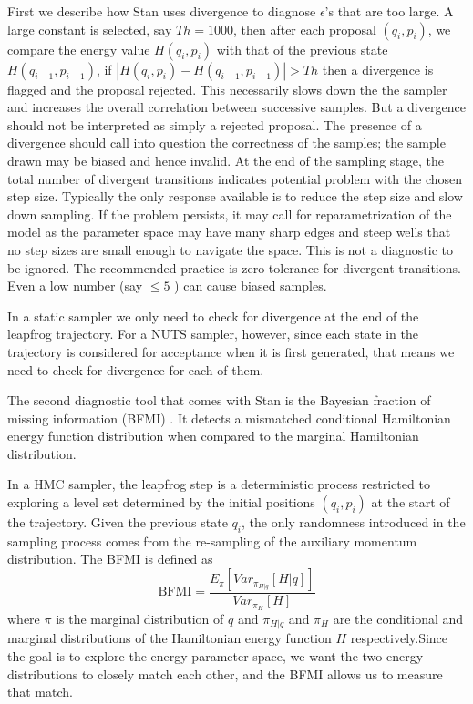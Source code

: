 \documentclass[12pt]{report}
\begin{document}
First we describe how Stan uses
divergence to diagnose $\epsilon$'s that are too large. A large constant
is selected, say $Th = 1000$, then after each proposal $(q_i,p_i)$, we compare the
energy value $H(q_i,p_i)$ with that of the previous state $H(q_{i-1},p_{i-1})$,
if $|H(q_i,p_i) - H(q_{i-1},p_{i-1})|> Th$ then a divergence is flagged and the
proposal rejected. This necessarily slows down the the sampler and increases the overall correlation between successive samples. But a divergence should not be interpreted as simply a rejected proposal. The presence of a divergence should call into question the correctness of the samples; the sample
drawn may be biased and hence invalid.
 At the end of the sampling stage, the total number of
divergent transitions indicates potential problem with the chosen step size. Typically the
only response available is to reduce the step size and slow down sampling.
If the problem persists, it may call for reparametrization of the model as the parameter
space may have many sharp edges and steep wells that no step sizes are small
enough to navigate the space.  This is not a diagnostic to be ignored. The recommended practice is zero tolerance for divergent transitions. Even a low number (say $\le 5 $ ) can cause biased samples.

In a static sampler we only need to check for divergence at the end of the leapfrog trajectory. For a NUTS sampler, however, since each state in the trajectory is considered for acceptance when it is first generated, that means we need to check for divergence for each of them. 


The second diagnostic tool that comes with Stan is the Bayesian fraction of
missing information (BFMI) \cite{betancourt2016diagnosing}. It detects a mismatched conditional Hamiltonian
energy function
distribution when compared to the marginal Hamiltonian distribution. 

In a HMC sampler, the leapfrog step is a deterministic process
restricted to exploring a level set determined by the 
initial positions $(q_i,p_i)$ at the start of the trajectory. Given the previous 
state $q_i$, the only randomness introduced in the sampling process comes from the re-sampling of the auxiliary
momentum distribution.  The BFMI is defined as 
\[ \text{BFMI} = \frac{ E_\pi[Var_{\pi_{H|q}}[H|q]]}{Var_{\pi_H}[H]} \]
where $\pi$ is the marginal distribution of $q$ and $\pi_{H|q}$ and $\pi_{H}$
are the conditional and marginal distributions of the Hamiltonian energy
function $H$ respectively.Since the goal is
to explore the energy parameter space, we want the two energy distributions to
 closely match each other, and the BFMI allows us to measure that match.
\end{document}
